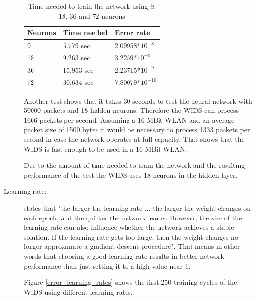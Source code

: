 \begin{description}
\begin{table}[htbp]
	\vspace{1.5em}
	\begin{center}
		\begin{tabular}{|l|l|l|}
		\hline
		\bf{Neurons}&\bf{Time needed}&{\bf Error rate}\\
		\hline
		9&5.779 sec&2.09958*$10^{-8}$\\
		\hline
		18&9.263 sec&3.2259*$10^{-9}$\\
		\hline
		36&15.953 sec&2.23715*$10^{-9}$\\
		\hline
		72&30.634 sec&7.80079*$10^{-10}$\\
		\hline
		\end{tabular}
	\end{center}
	\vspace{-1em}
	\caption{Time needed to train the network using 9, 18, 36 and 72 neurons}
	\label{train_neurons}
\end{table}

Another test shows that it takes 30 seconds to test the neural network with 50000 packets and 18 hidden neurons. Therefore the WIDS can process 1666 packets per second. Assuming a 16 MBit WLAN and an average packet size of 1500 bytes it would be necessary to process 1333 packets per second in case the network operates at full capacity. That shows that the WIDS is fast enough to be used in a 16 MBit WLAN.

Due to the amount of time needed to train the network and the resulting performance of the test the WIDS uses 18 neurons in the hidden layer.

\vspace{1.5em}

	\item [Learning rate:] \cite{nn_learning_rate} states that "the larger the learning rate ... the larger the weight changes on each epoch, and the quicker the network learns. However, the size of the learning rate can also influence whether the network achieves a stable solution. If the learning rate gets too large, then the weight changes no longer approximate a gradient descent procedure". That means in other words that choosing a good learning rate results in better network performance than just setting it to a high value near $1$.

Figure \ref{error_learning_rates} shows the first 250 training cycles of the WIDS using different learning rates.


\end{description}

